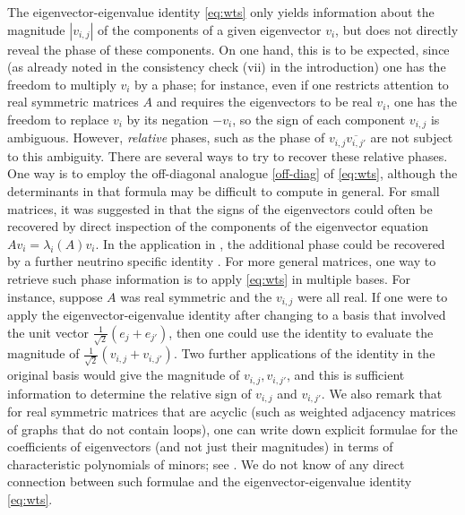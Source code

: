 \documentclass[12pt]{amsart}
\begin{document}
The eigenvector-eigenvalue identity \eqref{eq:wts} only yields information about the magnitude $|v_{i,j}|$ of the components of a given eigenvector $v_i$, but does not directly reveal the phase of these components.  On one hand, this is to be expected, since (as already noted in the consistency check (vii) in the introduction) one has the freedom to multiply $v_i$ by a phase; for instance, even if one restricts attention to real symmetric matrices $A$ and requires the eigenvectors to be real $v_i$, one has the freedom to replace $v_i$ by its negation $-v_i$, so the sign of each component $v_{i,j}$ is ambiguous.  However, \emph{relative} phases, such as the phase of $v_{i,j} \overline{v_{i,j'}}$ are not subject to this ambiguity.  There are several ways to try to recover these relative phases.  One way is to employ the off-diagonal analogue \eqref{off-diag} of \eqref{eq:wts}, although the determinants in that formula may be difficult to compute in general.  For small matrices, it was suggested in \cite{Mukherjee1989} that the signs of the eigenvectors could often be recovered by direct inspection of the components of the eigenvector equation $A v_i = \lambda_i(A) v_i$.  In the application in \cite{Denton:2019ovn}, the additional phase could be recovered by a further neutrino specific identity \cite{Toshev:1991ku}.  For more general matrices, one way to retrieve such phase information is to apply \eqref{eq:wts} in multiple bases.  For instance, suppose $A$ was real symmetric and the $v_{i,j}$ were all real.  If one were to apply the eigenvector-eigenvalue identity after changing to a basis that involved the unit vector $\frac{1}{\sqrt{2}} (e_j + e_{j'})$, then one could use the identity to evaluate the magnitude of $\frac{1}{\sqrt{2}} ( v_{i,j} + v_{i,j'} )$.  Two further applications of the identity in the original basis would give the magnitude of $v_{i,j}, v_{i,j'}$, and this is sufficient information to determine the relative sign of $v_{i,j}$ and $v_{i,j'}$.  We also remark that for real symmetric matrices that are acyclic (such as weighted adjacency matrices of graphs that do not contain loops), one can write down explicit formulae for the coefficients of eigenvectors (and not just their magnitudes) in terms of characteristic polynomials of minors; see \cite{BK}.  We do not know of any direct connection between such formulae and the eigenvector-eigenvalue identity \eqref{eq:wts}.
\end{document}

